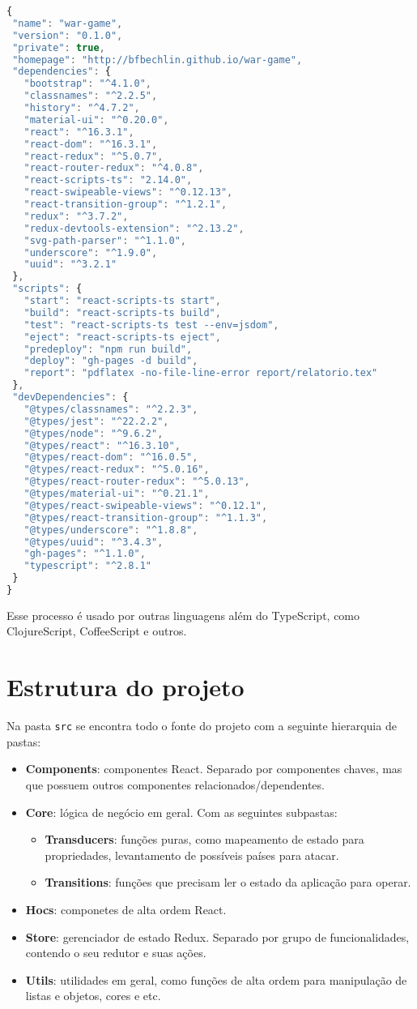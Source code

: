\documentclass[rel_mlp]{iiufrgs}
\begin{document}
\begin{lstlisting}[language=JavaScript]
{
 "name": "war-game",
 "version": "0.1.0",
 "private": true,
 "homepage": "http://bfbechlin.github.io/war-game",
 "dependencies": {
   "bootstrap": "^4.1.0",
   "classnames": "^2.2.5",
   "history": "^4.7.2",
   "material-ui": "^0.20.0",
   "react": "^16.3.1",
   "react-dom": "^16.3.1",
   "react-redux": "^5.0.7",
   "react-router-redux": "^4.0.8",
   "react-scripts-ts": "2.14.0",
   "react-swipeable-views": "^0.12.13",
   "react-transition-group": "^1.2.1",
   "redux": "^3.7.2",
   "redux-devtools-extension": "^2.13.2",
   "svg-path-parser": "^1.1.0",
   "underscore": "^1.9.0",
   "uuid": "^3.2.1"
 },
 "scripts": {
   "start": "react-scripts-ts start",
   "build": "react-scripts-ts build",
   "test": "react-scripts-ts test --env=jsdom",
   "eject": "react-scripts-ts eject",
   "predeploy": "npm run build",
   "deploy": "gh-pages -d build",
   "report": "pdflatex -no-file-line-error report/relatorio.tex"
 },
 "devDependencies": {
   "@types/classnames": "^2.2.3",
   "@types/jest": "^22.2.2",
   "@types/node": "^9.6.2",
   "@types/react": "^16.3.10",
   "@types/react-dom": "^16.0.5",
   "@types/react-redux": "^5.0.16",
   "@types/react-router-redux": "^5.0.13",
   "@types/material-ui": "^0.21.1",
   "@types/react-swipeable-views": "^0.12.1",
   "@types/react-transition-group": "^1.1.3",
   "@types/underscore": "^1.8.8",
   "@types/uuid": "^3.4.3",
   "gh-pages": "^1.1.0",
   "typescript": "^2.8.1"
 }
}
\end{lstlisting}

Esse processo é usado por outras linguagens além do TypeScript, como ClojureScript, CoffeeScript e outros.

\section{Estrutura do projeto}
Na pasta \verb|src| se encontra todo o fonte do projeto com a seguinte hierarquia de pastas:
\begin{itemize}
  \item \textbf{Components}: componentes React. Separado por componentes chaves, mas que possuem outros componentes relacionados/dependentes.
  \item \textbf{Core}: lógica de negócio em geral. Com as seguintes subpastas:
    \begin{itemize}
      \item \textbf{Transducers}: funções puras, como mapeamento de estado para propriedades, levantamento de possíveis países para atacar.
      \item \textbf{Transitions}: funções que precisam ler o estado da aplicação para operar.
    \end{itemize}
  \item \textbf{Hocs}: componetes de alta ordem React.
  \item \textbf{Store}: gerenciador de estado Redux. Separado por grupo de funcionalidades, contendo o seu redutor e suas ações.
  \item \textbf{Utils}: utilidades em geral, como funções de alta ordem para manipulação de listas e objetos, cores e etc.
\end{itemize}
\end{document}
